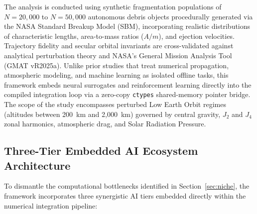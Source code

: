 The analysis is conducted using synthetic fragmentation populations of $N = 20,000$ to $N = 50,000$ autonomous debris objects procedurally generated via the NASA Standard Breakup Model (SBM), incorporating realistic distributions of characteristic lengths, area-to-mass ratios ($A/m$), and ejection velocities. Trajectory fidelity and secular orbital invariants are cross-validated against analytical perturbation theory and NASA's General Mission Analysis Tool (GMAT vR2025a). Unlike prior studies that treat numerical propagation, atmospheric modeling, and machine learning as isolated offline tasks, this framework embeds neural surrogates and reinforcement learning directly into the compiled integration loop via a zero-copy \texttt{ctypes} shared-memory pointer bridge. The scope of the study encompasses perturbed Low Earth Orbit regimes (altitudes between 200~km and 2,000~km) governed by central gravity, $J_2$ and $J_4$ zonal harmonics, atmospheric drag, and Solar Radiation Pressure.

\subsection{Three-Tier Embedded AI Ecosystem Architecture}
\label{subsec:three_tier_ai}

To dismantle the computational bottlenecks identified in Section~\ref{sec:niche}, the framework incorporates three synergistic AI tiers embedded directly within the numerical integration pipeline:

